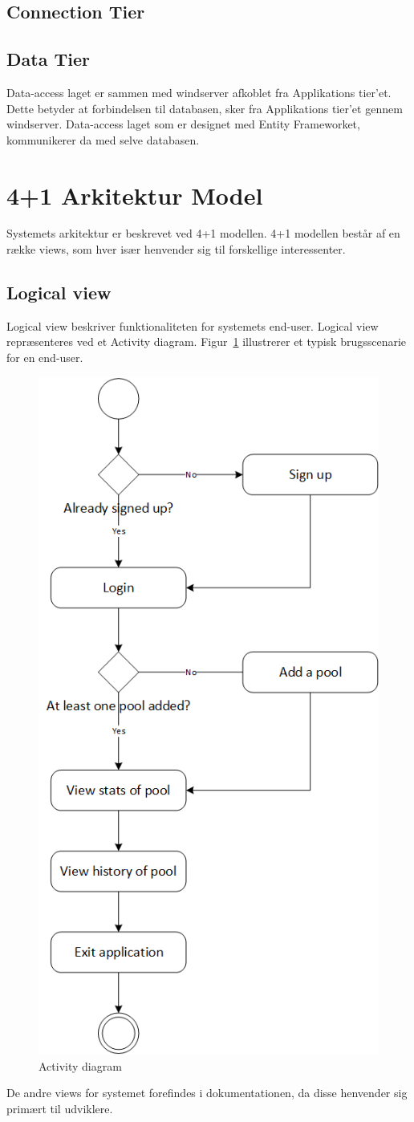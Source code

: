 \subsection{Connection Tier}\label{sec:Connectiontier}

\subsection{Data Tier}
Data-access laget er sammen med \gls{windserver} afkoblet fra Applikations tier'et. Dette betyder at forbindelsen til databasen, sker fra Applikations tier'et gennem \gls{windserver}. Data-access laget som er designet med Entity Frameworket, kommunikerer da med selve databasen.
\section{4+1 Arkitektur Model}
Systemets arkitektur er beskrevet ved 4+1 modellen. 4+1 modellen består af en række views, som hver især henvender sig til forskellige interessenter.

\subsection{Logical view}
Logical view beskriver funktionaliteten for systemets end-user. Logical view repræsenteres ved et Activity diagram. Figur~\ref{fig:ActivityDiagram} illustrerer et typisk brugsscenarie for en end-user. 
\begin{figure}
\centering
\includegraphics[width=0.55\linewidth]{figs/arkitektur/ActivityDiagram.PNG}
\caption{Activity diagram}
\label{fig:ActivityDiagram}
\end{figure}

De andre views for systemet forefindes i dokumentationen, da disse henvender sig primært til udviklere.
